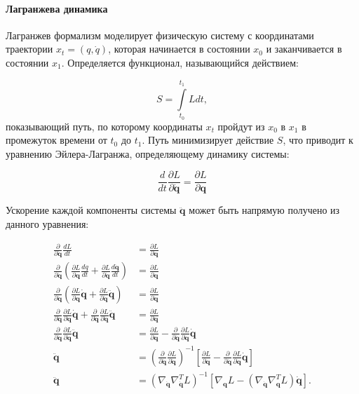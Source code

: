 \documentclass[12pt, twoside]{article}
\begin{document}
    \paragraph{Лагранжева динамика}		

        Лагранжев формализм \cite{cranmer2020lagrangian} моделирует физическую систему с координатами траектории $x_t = (q, \dot{q})$, которая начинается в состоянии $x_0$ и заканчивается в состоянии $x_1$. Определяется функционал, называющийся действием:

        $$S=\int\limits_{t_0}^{t_1} L dt,$$
        показывающий путь, по которому координаты $x_t$ пройдут из $x_0$ в $x_1$ в промежуток времени от $t_0$ до $t_1$. Путь минимизирует действие $S$, что приводит к уравнению Эйлера-Лагранжа, определяющему динамику системы:

        $$\frac{d}{dt} \frac{\partial L}{\partial \dot{\mathbf{q}}} = \frac{\partial L}{\partial \mathbf{q}}$$

        Ускорение каждой компоненты системы $ \ddot{\mathbf{q}}$ может быть напрямую получено из данного уравнения:

        $$\begin{aligned}
            \frac{\partial}{\partial \dot{\mathbf{q}}} \frac{dL}{dt} &= \frac{\partial L}{\partial \mathbf{q}}\\
            \frac{\partial}{\partial \dot{\mathbf{q}}} \left( \frac{\partial L}{\partial \mathbf{q}} \frac{dq}{dt} + \frac{\partial L}{\partial \dot{\mathbf{q}}} \frac{d\dot{\mathbf{q}}}{dt} \right) &= \frac{\partial L}{\partial \mathbf{q}} \\
            \frac{\partial}{\partial \dot{\mathbf{q}}} \left( \frac{\partial L}{\partial \mathbf{q}} \dot{\mathbf{q}} + \frac{\partial L}{\partial \dot{\mathbf{q}}} \ddot{\mathbf{q}} \right) &= \frac{\partial L}{\partial \mathbf{q}} \\ 
            \frac{\partial}{\partial \dot{\mathbf{q}}} \frac{\partial L}{\partial \mathbf{q}} \dot{\mathbf{q}} + \frac{\partial}{\partial \dot{\mathbf{q}}} \frac{\partial L}{\partial \dot{\mathbf{q}}} \ddot{\mathbf{q}} &= \frac{\partial L}{\partial \mathbf{q}} \\
            \frac{\partial}{\partial \dot{\mathbf{q}}} \frac{\partial L}{\partial \dot{\mathbf{q}}} \ddot{\mathbf{q}} &= \frac{\partial L}{\partial \mathbf{q}} - \frac{\partial}{\partial \dot{\mathbf{q}}} \frac{\partial L}{\partial \mathbf{q}} \dot{\mathbf{q}} \\
            \ddot{\mathbf{q}} &= \left( \frac{\partial}{\partial \dot{\mathbf{q}}} \frac{\partial L}{\partial \dot{\mathbf{q}}} \right)^{-1} \left[ \frac{\partial L}{\partial \mathbf{q}} - \frac{\partial}{\partial \dot{\mathbf{q}}} \frac{\partial L}{\partial \mathbf{q}} \dot{\mathbf{q}} \right] \\
            \ddot{\mathbf{q}} &= \left( \nabla_{\dot{\mathbf{q}}} \nabla_{\dot{\mathbf{q}}}^T L \right)^{-1} \left[ \nabla_{\mathbf{q}} L - \left( \nabla_{\dot{\mathbf{q}}} \nabla_{\mathbf{q}}^T L \right) \dot{\mathbf{q}} \right].
        \end{aligned}$$
\end{document}
